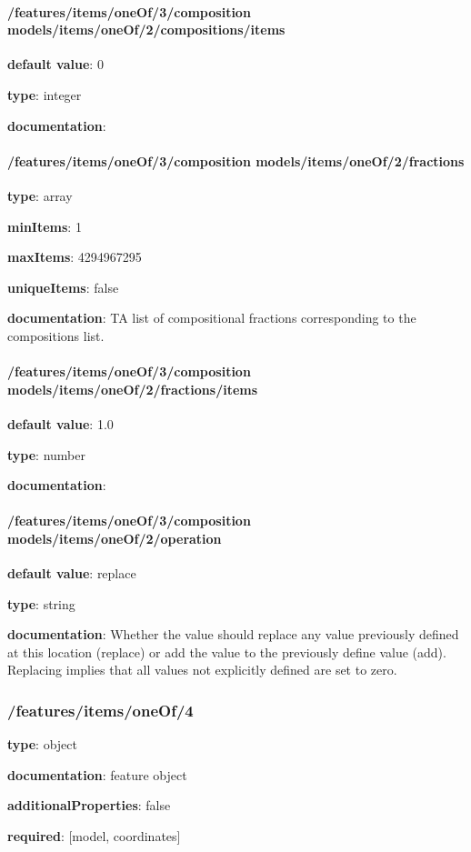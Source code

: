 \begin{itemized}
\paragraph{/features/items/oneOf/3/composition models/items/oneOf/2/compositions/items} \begin{itemized}
\item {\bf default value}: 0
\item {\bf type}: integer
\item {\bf documentation}: 
\end{itemized}\end{itemized}\paragraph{/features/items/oneOf/3/composition models/items/oneOf/2/fractions} \begin{itemized}
\item {\bf type}: array
\item {\bf minItems}: 1
\item {\bf maxItems}: 4294967295
\item {\bf uniqueItems}: false
\item {\bf documentation}: TA list of compositional fractions corresponding to the compositions list.
\paragraph{/features/items/oneOf/3/composition models/items/oneOf/2/fractions/items} \begin{itemized}
\item {\bf default value}: 1.0
\item {\bf type}: number
\item {\bf documentation}: 
\end{itemized}\end{itemized}\paragraph{/features/items/oneOf/3/composition models/items/oneOf/2/operation} \begin{itemized}
\item {\bf default value}: replace
\item {\bf type}: string
\item {\bf documentation}: Whether the value should replace any value previously defined at this location (replace) or add the value to the previously define value (add). Replacing implies that all values not explicitly defined are set to zero.
\end{itemized}\subsubsection{/features/items/oneOf/4} \begin{itemized}
\item {\bf type}: object
\item {\bf documentation}: feature object
\item {\bf additionalProperties}: false
\item {\bf required}: [model, coordinates]\end{itemized}
